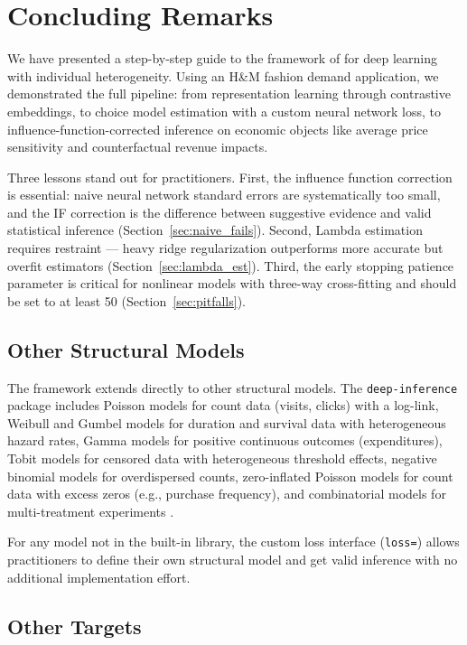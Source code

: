 \section{Concluding Remarks}\label{sec:conclusion}

We have presented a step-by-step guide to the framework of \citet{farrell2021deep, farrell2025deep} for deep learning with individual heterogeneity. Using an H\&M fashion demand application, we demonstrated the full pipeline: from representation learning through contrastive embeddings, to choice model estimation with a custom neural network loss, to influence-function-corrected inference on economic objects like average price sensitivity and counterfactual revenue impacts.

Three lessons stand out for practitioners. First, the influence function correction is essential: naive neural network standard errors are systematically too small, and the IF correction is the difference between suggestive evidence and valid statistical inference (Section~\ref{sec:naive_fails}). Second, Lambda estimation requires restraint --- heavy ridge regularization outperforms more accurate but overfit estimators (Section~\ref{sec:lambda_est}). Third, the early stopping patience parameter is critical for nonlinear models with three-way cross-fitting and should be set to at least 50 (Section~\ref{sec:pitfalls}).

\subsection{Other Structural Models}

The framework extends directly to other structural models. The \texttt{deep-inference} package includes Poisson models for count data (visits, clicks) with a log-link, Weibull and Gumbel models for duration and survival data with heterogeneous hazard rates, Gamma models for positive continuous outcomes (expenditures), Tobit models for censored data with heterogeneous threshold effects, negative binomial models for overdispersed counts, zero-inflated Poisson models for count data with excess zeros (e.g., purchase frequency), and combinatorial models for multi-treatment experiments \citep{ye2025combinatorial}.

For any model not in the built-in library, the custom loss interface (\texttt{loss=}) allows practitioners to define their own structural model and get valid inference with no additional implementation effort.

\subsection{Other Targets}

